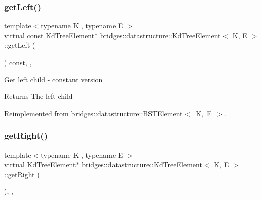 \subsubsection{\texorpdfstring{getLeft()}{getLeft()}\hspace{0.1cm}{\footnotesize\ttfamily [2/2]}}
{\footnotesize\ttfamily template$<$typename K , typename E $>$ \\
virtual const \mbox{\hyperlink{classbridges_1_1datastructure_1_1_kd_tree_element}{Kd\+Tree\+Element}}$\ast$ \mbox{\hyperlink{classbridges_1_1datastructure_1_1_kd_tree_element}{bridges\+::datastructure\+::\+Kd\+Tree\+Element}}$<$ K, E $>$\+::get\+Left (\begin{DoxyParamCaption}{ }\end{DoxyParamCaption}) const\hspace{0.3cm}{\ttfamily [inline]}, {\ttfamily [override]}, {\ttfamily [virtual]}}

Get left child -\/ constant version

\begin{DoxyReturn}{Returns}
The left child 
\end{DoxyReturn}


Reimplemented from \mbox{\hyperlink{classbridges_1_1datastructure_1_1_b_s_t_element_abac324ef0b480420bd82ecfe4501d60d}{bridges\+::datastructure\+::\+B\+S\+T\+Element$<$ K, E $>$}}.

\mbox{\label{classbridges_1_1datastructure_1_1_kd_tree_element_a366e3b0987169220d3a145043be2373d}} 
\subsubsection{\texorpdfstring{getRight()}{getRight()}\hspace{0.1cm}{\footnotesize\ttfamily [1/2]}}
{\footnotesize\ttfamily template$<$typename K , typename E $>$ \\
virtual \mbox{\hyperlink{classbridges_1_1datastructure_1_1_kd_tree_element}{Kd\+Tree\+Element}}$\ast$ \mbox{\hyperlink{classbridges_1_1datastructure_1_1_kd_tree_element}{bridges\+::datastructure\+::\+Kd\+Tree\+Element}}$<$ K, E $>$\+::get\+Right (\begin{DoxyParamCaption}{ }\end{DoxyParamCaption})\hspace{0.3cm}{\ttfamily [inline]}, {\ttfamily [override]}, {\ttfamily [virtual]}}

